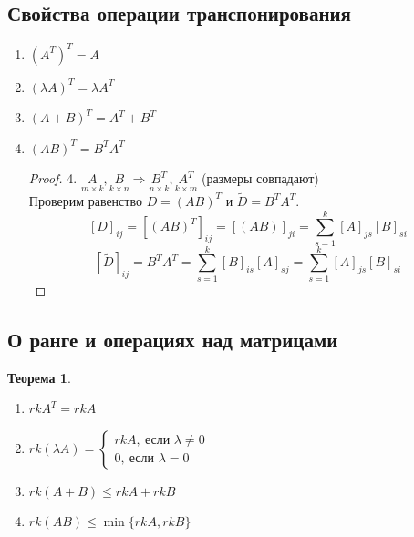 \documentclass[a4paper, 12pt]{article}
\newcommand\tab[1][.5cm]{\hspace*{#1}}
\theoremstyle{definition}
\newtheorem*{theorem}{Теорема}
\begin{document}
  \subsection{Свойства операции транспонирования}
  \begin{enumerate}
    \item $(A^T)^T = A$
    \item $(\lambda A)^T = \lambda A^T$
    \item $(A+B)^T = A^T + B^T$
    \item $(AB)^T = B^TA^T$   
    \begin{proof}
      4. $\underset{m \times k}{A}, \underset{k \times n}{B} \Longrightarrow \underset{n \times k}{B^T}, \underset{k \times m}{A^T}$ (размеры совпадают) \\
      Проверим равенство $D = (AB)^T \text{ и } \widetilde{D} = B^TA^T$.
      $$[D]_{ij} = [(AB)^T]_{ij} = [(AB)]_{ji} = \sum \limits_{s=1}^k[A]_{js}[B]_{si}$$ 
      $$[\widetilde{D}]_{ij} = B^TA^T = \sum \limits_{s=1}^k[B]_{is}[A]_{sj} = \sum \limits_{s=1}^k[A]_{js}[B]_{si}$$ 
    \end{proof} 
  \end{enumerate}
  \subsection{О ранге и операциях над матрицами}
  \begin{theorem} \tab
    \begin{enumerate}
      \item $rkA^T = rkA$
      \item $rk(\lambda A) = \begin{cases}
        rkA, \ \text{если } \lambda \neq 0 \\
        0, \ \text{если } \lambda = 0
      \end{cases}
      $ 
      \item $rk(A+B) \leq rkA + rkB$ 
      \item $rk(AB) \leq \min\{rkA, rkB\}$ 
    \end{enumerate}
  \end{theorem}  
    
\end{document}
